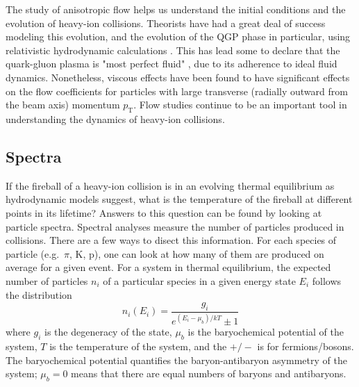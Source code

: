 The study of anisotropic flow helps us understand the initial conditions and the evolution of heavy-ion collisions.
Theorists have had a great deal of success modeling  this evolution, and the evolution of the QGP phase in particular, using relativistic hydrodynamic calculations \cite{Heinz:2013th}.
This has lead some to declare that the quark-gluon plasma is "most perfect fluid" \cite{Heinz:2005zg}, due to its adherence to ideal fluid dynamics.
Nonetheless, viscous effects have been found to have significant effects on the flow coefficients for particles with large transverse (radially outward from the beam axis) momentum $p_\mathrm{T}$.
Flow studies continue to be an important tool in understanding the dynamics of heavy-ion collisions.

\subsection{Spectra}

If the fireball of a heavy-ion collision is in an evolving thermal equilibrium as hydrodynamic models suggest, what is the temperature of the fireball at different points in its lifetime? 
Answers to this question can be found by looking at particle spectra.
Spectral analyses measure the number of particles produced in collisions.
There are a few ways to disect this information.
For each species of particle (e.g.\ $\pi$, K, p), one can look at how many of them are produced on average for a given event.
For a system in thermal equilibrium, the expected number of particles $n_i$ of a particular species in a given energy state $E_i$ follows the distribution
\begin{equation}
\label{eq:ThermalDistribution}
n_i(E_i) = \frac{g_i}{e^{(E_i - \mu_b)/kT} \pm 1}
\end{equation}
where $g_i$ is the degeneracy of the state, $\mu_b$ is the baryochemical potential of the system,  $T$ is the temperature of the system, and the  $+/-$ is for fermions/bosons. 
The baryochemical potential quantifies the baryon-antibaryon asymmetry of the system; $\mu_b = 0$ means that there are equal numbers of baryons and antibaryons.


